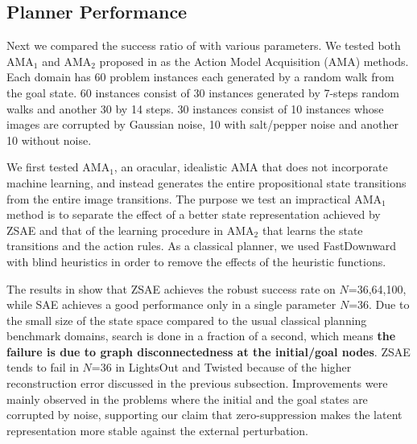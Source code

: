 \subsection{Planner Performance}

Next we compared the success ratio of \latentplanner with various parameters.
We tested both AMA$_1$ and AMA$_2$ proposed in \cite{Asai2018} as the Action Model Acquisition (AMA) methods.
% 
Each domain has 60 problem instances each generated by a random walk from
the goal state. 60 instances consist of 30 instances generated by 7-steps random walks
and another 30 by 14 steps. 30 instances consist of 10 instances whose images are corrupted by Gaussian noise,
10 with salt/pepper noise and another 10 without noise.

We first tested AMA$_1$, an oracular, idealistic AMA that does not incorporate machine learning,
and instead generates the entire propositional state transitions from the entire image transitions.
The purpose we test an impractical AMA$_1$ method is
to separate the effect of a better state representation achieved by ZSAE
and that of the learning procedure in AMA$_2$ that learns the state transitions and the action rules.
As a classical planner, we used FastDownward \cite{Helmert04} with blind heuristics in order to
remove the effects of the heuristic functions.

The results in  show that ZSAE achieves the robust success rate on $N$=36,64,100,
while SAE achieves a good performance only in a single parameter $N$=36.
% 
Due to the small size of the state space compared to the usual classical planning benchmark domains,
search is done in a fraction of a second, which means \textbf{the failure is due to graph disconnectedness at the initial/goal nodes}.
ZSAE tends to fail in $N$=36 in LightsOut and Twisted because of the higher reconstruction error
discussed in the previous subsection.
% 
Improvements were mainly observed in the problems where
the initial and the goal states are corrupted by noise, supporting our claim that
zero-suppression makes the latent representation more stable against the external perturbation.

